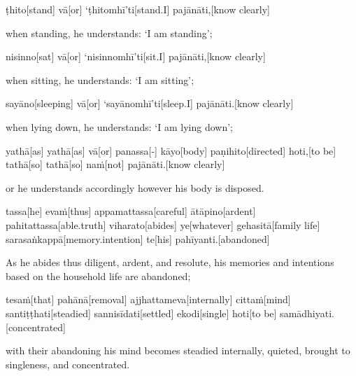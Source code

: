 \begin{samepage}
\begingl[glneveryline={\PaliGlossA,\PaliGlossB}]
ṭhito[stand] vā[or] ‘ṭhitomhī’ti[stand.I] pajānāti,[know clearly]
\endgl
\nopagebreak
\linespread{0.5}
\begin{spacin}{0.2}
{\PaliGlossFT when standing, he understands: ‘I am standing’;}
\end{spacin}
\vskip 12pt
\end{samepage}
\begin{samepage}
\begingl[glneveryline={\PaliGlossA,\PaliGlossB}]
nisinno[sat] vā[or] ‘nisinnomhī’ti[sit.I] pajānāti,[know clearly]
\endgl
\nopagebreak
\linespread{0.5}
\begin{spacin}{0.2}
{\PaliGlossFT when sitting, he understands: ‘I am sitting’;}
\end{spacin}
\vskip 12pt
\end{samepage}
\begin{samepage}
\begingl[glneveryline={\PaliGlossA,\PaliGlossB}]
sayāno[sleeping] vā[or] ‘sayānomhī’ti[sleep.I] pajānāti.[know clearly]
\endgl
\nopagebreak
\linespread{0.5}
\begin{spacin}{0.2}
{\PaliGlossFT when lying down, he understands: ‘I am lying down’;}
\end{spacin}
\vskip 12pt
\end{samepage}
\begin{samepage}
\begingl[glneveryline={\PaliGlossA,\PaliGlossB}]
yathā[as] yathā[as] vā[or] panassa[-] kāyo[body] paṇihito[directed] hoti,[to be] tathā[so] tathā[so] naṁ[not] pajānāti.[know clearly]
\endgl
\nopagebreak
\linespread{0.5}
\begin{spacin}{0.2}
{\PaliGlossFT or he understands accordingly however his body is disposed.}
\end{spacin}
\vskip 12pt
\end{samepage}
\begin{samepage}
\begingl[glneveryline={\PaliGlossA,\PaliGlossB}]
tassa[he] evaṁ[thus] appamattassa[careful] ātāpino[ardent] pahitattassa[able.truth] viharato[abides] ye[whatever] gehasitā[family life] sarasaṅkappā[memory.intention] te[his] pahīyanti.[abandoned]
\endgl
\nopagebreak
\linespread{0.5}
\begin{spacin}{0.2}
{\PaliGlossFT As he abides thus diligent, ardent, and resolute, his memories and intentions based on the household life are abandoned;}
\end{spacin}
\vskip 12pt
\end{samepage}
\begin{samepage}
\begingl[glneveryline={\PaliGlossA,\PaliGlossB}]
tesaṁ[that] pahānā[removal] ajjhattameva[internally] cittaṁ[mind] santiṭṭhati[steadied] sannisīdati[settled] ekodi[single] hoti[to be] samādhiyati.[concentrated]
\endgl
\nopagebreak
\linespread{0.5}
\begin{spacin}{0.2}
{\PaliGlossFT with their abandoning his mind becomes steadied internally, quieted, brought to singleness, and concentrated.}
\end{spacin}
\vskip 12pt
\end{samepage}
